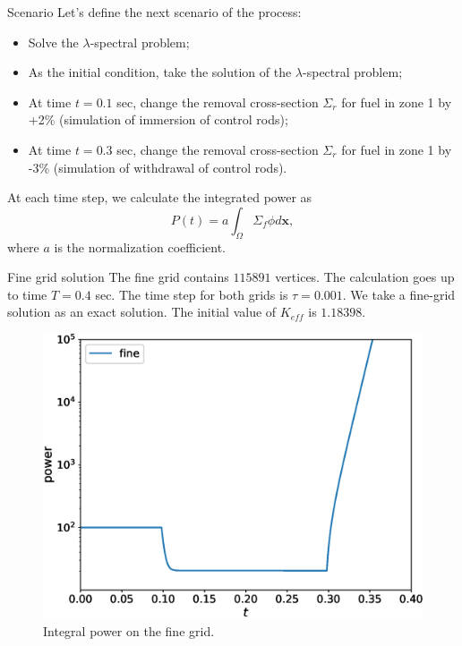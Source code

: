 \documentclass[10pt,pdf,hyperref={unicode}]{beamer}
\begin{document}
	\begin{frame}{Scenario}
		Let's define the next scenario of the process:
		\begin{itemize}
			\item Solve the $\lambda$-spectral problem;
			\item As the initial condition, take the solution of the $\lambda$-spectral problem;
			\item At time $t = 0.1$ sec, change the removal cross-section $\Sigma_r$ for fuel in zone 1 by +2\% (simulation of immersion of control rods);
			\item At time $t = 0.3$ sec, change the removal cross-section $\Sigma_r$ for fuel in zone 1 by -3\% (simulation of withdrawal of control rods).
		\end{itemize}
		At each time step, we calculate the integrated power as
		\[P(t) = a\int_{\Omega}\Sigma_f \phi d\bm x,\]
		where $a$ is the normalization coefficient.
	\end{frame}

	\begin{frame}{Fine grid solution}
		The fine grid contains $115891$ vertices.
		The calculation goes up to time $T = 0.4$ sec.
		The time step for both grids is $\tau = 0.001$.
		We take a fine-grid solution as an exact solution.
		The initial value of $K_{eff}$ is $1.18398$.
		
		\begin{figure}[h]
			\centering
			\includegraphics[width=0.5\linewidth]{small/power_fine.eps} 
			\caption{Integral power on the fine grid.}
		\end{figure}		
	\end{frame}
\end{document}
